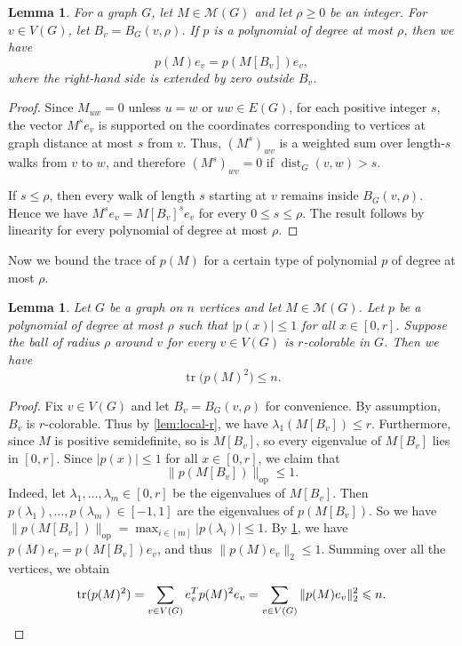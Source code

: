 \documentclass[10pt,a4paper]{amsart}
\newtheorem{lemma}[theorem]{Lemma}
\numberwithin{theorem}{section}
\newcommand{\cM}{\mathcal M}
\renewcommand{\le}{\leqslant}
\renewcommand{\ge}{\geqslant}
\newcommand{\dist}{\operatorname{dist}}
\newcommand{\Tr}{\operatorname{tr}}
\begin{document}
\begin{lemma}\label{lem:poly-local}
For a graph $G$, let $M\in\mathcal M(G)$ and let $\rho\ge 0$ be an integer. For $v\in V(G)$, let $B_v=B_G(v,\rho)$.
If $p$ is a polynomial of degree at most $\rho$, then we have
\[p(M)e_v=p(M[B_v])e_v,\]
where the right-hand side is extended by zero outside $B_v$.
\end{lemma}

\begin{proof}
Since $M_{uw}=0$ unless $u=w$ or $uw\in E(G)$, for each positive integer $s$, the vector $M^s e_v$ is supported on the coordinates corresponding to vertices at graph distance at most $s$ from $v$. Thus, $(M^s)_{wv}$ is a weighted sum over length-$s$ walks from $v$ to $w$, and therefore $(M^s)_{wv}=0$ if $\dist_G(v,w)>s$.

If $s\le \rho$, then every walk of length $s$ starting at $v$ remains inside $B_G(v,\rho)$.  Hence we have $M^s e_v=M[B_v]^s e_v$ for every $0\le s\le \rho$. The result follows by linearity for every polynomial of degree at most $\rho$.
\end{proof}

Now we bound the trace of $p(M)$ for a certain type of polynomial $p$ of degree at most $\rho$.

\begin{lemma}\label{lem:trace}
Let $G$ be a graph on $n$ vertices and let $M\in \cM(G)$. Let $p$ be a polynomial of degree at most $\rho$ such that $|p(x)|\le 1$ for all $x\in [0,r]$. Suppose the ball of radius $\rho$ around $v$ for every $v\in V(G)$ is $r$-colorable in $G$. Then we have
\[ \Tr\bigl(p(M)^2\bigr)\le n.\]
\end{lemma}

\begin{proof}
Fix $v\in V(G)$ and let $B_v=B_G(v,\rho)$ for convenience. By assumption, $B_v$ is $r$-colorable. Thus by \cref{lem:local-r}, we have $\lambda_1(M[B_v])\le r$.
Furthermore, since $M$ is positive semidefinite, so is $M[B_v]$, so every eigenvalue of $M[B_v]$ lies in $[0,r]$.  Since $|p(x)|\le 1$ for all $x\in [0,r]$, we claim that \[\|p(M[B_v])\|_{\mathrm{op}}\le 1.\] 
Indeed, let $\lambda_1,\dots, \lambda_m\in [0,r]$ be the eigenvalues of $M[B_v]$. Then $p(\lambda_1),\dots, p(\lambda_m)\in [-1,1]$ are the eigenvalues of $p(M[B_v])$. So we have $\|p(M[B_v])\|_{\mathrm{op}} = \max_{i\in [m]} |p(\lambda_i)|\le 1$.
By \cref{lem:poly-local}, we have $p(M)e_v=p(M[B_v])e_v$, and thus $\|p(M)e_v\|_2\le 1$.
Summing over all the vertices, we obtain
\[\Tr(p(M)^2)=\sum_{v\in V(G)}e_v^Tp(M)^2e_v=\sum_{v\in V(G)}\|p(M)e_v\|_2^2\le n.\qedhere\]
\end{proof}
\end{document}
